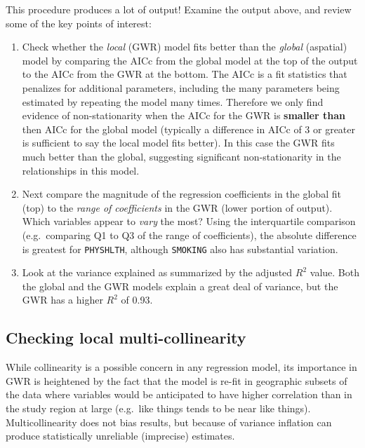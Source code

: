 \documentclass[
]{book}
\newcommand{\passthrough}[1]{#1}
\providecommand{\tightlist}{%
  \setlength{\itemsep}{0pt}\setlength{\parskip}{0pt}}
\begin{document}
This procedure produces a lot of output! Examine the output above, and review some of the key points of interest:

\begin{enumerate}
\def\labelenumi{\arabic{enumi}.}
\tightlist
\item
  Check whether the \emph{local} (GWR) model fits better than the \emph{global} (aspatial) model by comparing the AICc from the global model at the top of the output to the AICc from the GWR at the bottom. The AICc is a fit statistics that penalizes for additional parameters, including the many parameters being estimated by repeating the model many times. Therefore we only find evidence of non-stationarity when the AICc for the GWR is \textbf{smaller than} then AICc for the global model (typically a difference in AICc of 3 or greater is sufficient to say the local model fits better). In this case the GWR fits much better than the global, suggesting significant non-stationarity in the relationships in this model.
\item
  Next compare the magnitude of the regression coefficients in the global fit (top) to the \emph{range of coefficients} in the GWR (lower portion of output). Which variables appear to \emph{vary} the most? Using the interquartile comparison (e.g.~comparing Q1 to Q3 of the range of coefficients), the absolute difference is greatest for \passthrough{\lstinline!PHYSHLTH!}, although \passthrough{\lstinline!SMOKING!} also has substantial variation.
\item
  Look at the variance explained as summarized by the adjusted \(R^2\) value. Both the global and the GWR models explain a great deal of variance, but the GWR has a higher \(R^2\) of 0.93.
\end{enumerate}

\hypertarget{checking-local-multi-collinearity}{%
\subsection{Checking local multi-collinearity}\label{checking-local-multi-collinearity}}

While collinearity is a possible concern in any regression model, its importance in GWR is heightened by the fact that the model is re-fit in geographic subsets of the data where variables would be anticipated to have higher correlation than in the study region at large (e.g.~like things tends to be near like things). Multicollinearity does not bias results, but because of variance inflation can produce statistically unreliable (imprecise) estimates.
\end{document}
